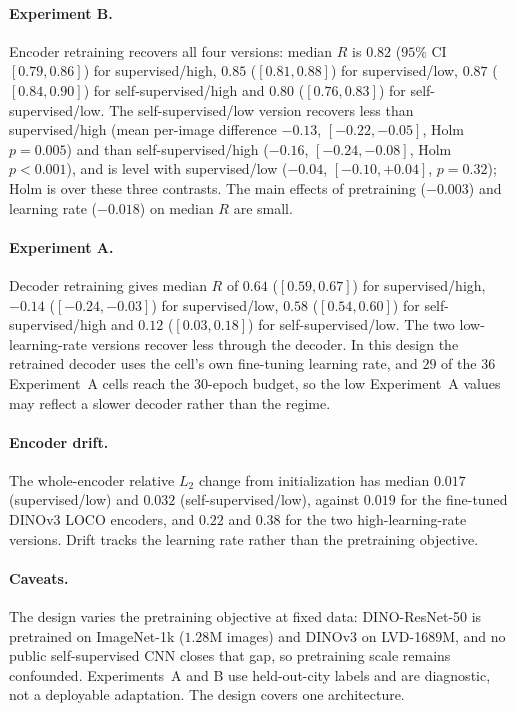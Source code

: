 \paragraph{Experiment B.} Encoder retraining recovers all four versions: median
$R$ is $0.82$ ($95\%$ CI $[0.79, 0.86]$) for supervised/high, $0.85$
($[0.81, 0.88]$) for supervised/low, $0.87$ ($[0.84, 0.90]$) for
self-supervised/high and $0.80$ ($[0.76, 0.83]$) for self-supervised/low.  The
self-supervised/low version recovers less than supervised/high (mean per-image
difference $-0.13$, $[-0.22, -0.05]$, Holm $p = 0.005$) and than
self-supervised/high ($-0.16$, $[-0.24, -0.08]$, Holm $p < 0.001$), and is level
with supervised/low ($-0.04$, $[-0.10, +0.04]$, $p = 0.32$); Holm is over these
three contrasts.  The main effects of pretraining ($-0.003$) and learning rate
($-0.018$) on median $R$ are small.

\paragraph{Experiment A.} Decoder retraining gives median $R$ of $0.64$
($[0.59, 0.67]$) for supervised/high, $-0.14$ ($[-0.24, -0.03]$) for
supervised/low, $0.58$ ($[0.54, 0.60]$) for self-supervised/high and $0.12$
($[0.03, 0.18]$) for self-supervised/low.  The two low-learning-rate versions
recover less through the decoder.  In this design the retrained decoder uses
the cell's own fine-tuning learning rate, and $29$ of the $36$ Experiment~A
cells reach the 30-epoch budget, so the low Experiment~A values may reflect a
slower decoder rather than the regime.

\paragraph{Encoder drift.} The whole-encoder relative $L_2$ change from
initialization has median $0.017$ (supervised/low) and $0.032$
(self-supervised/low), against $0.019$ for the fine-tuned DINOv3 LOCO encoders,
and $0.22$ and $0.38$ for the two high-learning-rate versions.  Drift tracks the
learning rate rather than the pretraining objective.

\paragraph{Caveats.} The design varies the pretraining objective at fixed data:
DINO-ResNet-50 is pretrained on ImageNet-1k ($1.28$M images) and DINOv3 on
LVD-1689M, and no public self-supervised CNN closes that gap, so pretraining
scale remains confounded.  Experiments~A and B use held-out-city labels and are
diagnostic, not a deployable adaptation.  The design covers one architecture.
